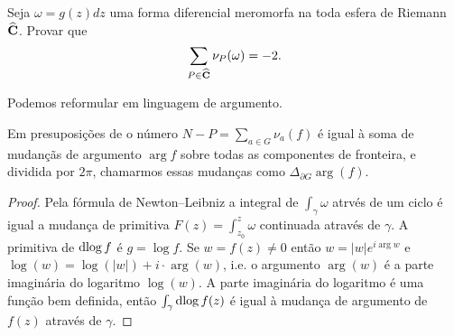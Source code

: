 \begin{problema}
Seja $\omega = g(z) dz$ uma forma diferencial meromorfa na toda esfera de Riemann $\widehat{\mathbf{C}}$.
Provar que
\begin{equation}
\sum_{P\in\widehat{\mathbf{C}}} \nu_P(\omega) = -2.
\end{equation}
\end{problema}

Podemos reformular  em linguagem de argumento.
\begin{teorema}
Em presuposições de  o número $N-P = \sum_{a\in G} \nu_a(f)$
é igual à soma de mudançãs de argumento $\arg f$ sobre todas as componentes de fronteira,
e dividida por $2\pi$, chamarmos essas mudanças como $\Delta_{\partial G} \arg(f)$.
\end{teorema}
\begin{proof}
Pela fórmula de Newton--Leibniz a integral de $\int_\gamma \omega$ atrvés de um ciclo é igual
a mudança de primitiva $F(z) = \int_{z_0}^z \omega$ continuada através de $\gamma$.
A primitiva de $\operatorname{dlog} f$ é $g=\log f$. Se $w=f(z)\neq0$ então $w = |w| e^{i\arg w}$
e $\log(w) = \log(|w|) + i\cdot \arg(w)$,
i.e. o argumento $\arg(w)$ é a parte imaginária do logaritmo $\log(w)$.
A parte imaginária do logaritmo é uma função bem definida, então
$\int_\gamma \operatorname{dlog} f(z)$ é igual à mudança de argumento de $f(z)$ através de $\gamma$.
\end{proof}


